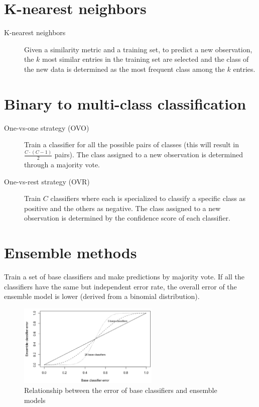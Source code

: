 \section{K-nearest neighbors}

\begin{description}
    \item[K-nearest neighbors] 
        Given a similarity metric and a training set,
        to predict a new observation, the $k$ most similar entries in the training set are selected
        and the class of the new data is determined as the most frequent class among the $k$ entries.
\end{description}



\section{Binary to multi-class classification}

\begin{description}
    \item[One-vs-one strategy (OVO)] 
        Train a classifier for all the possible pairs of classes (this will result in $\frac{C \cdot (C-1)}{2}$ pairs).
        The class assigned to a new observation is determined through a majority vote.

    \item[One-vs-rest strategy (OVR)] 
        Train $C$ classifiers where each is specialized to classify a specific class as positive and the others as negative.
        The class assigned to a new observation is determined by the confidence score of each classifier.
\end{description}



\section{Ensemble methods}
Train a set of base classifiers and make predictions by majority vote.
If all the classifiers have the same but independent error rate, 
the overall error of the ensemble model is lower (derived from a binomial distribution).

\begin{figure}[H]
    \centering
    \includegraphics[width=0.6\textwidth]{img/ensemble_error.png}
    \caption{Relationship between the error of base classifiers and ensemble models}
\end{figure}

